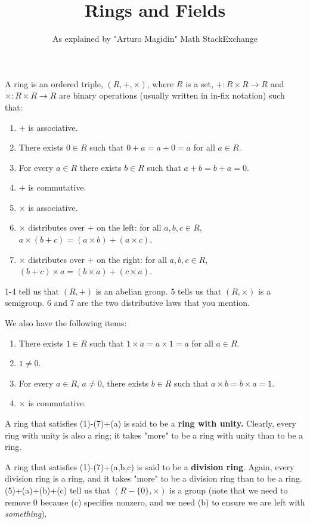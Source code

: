 \documentclass[12pt]{article}
\begin{document}
\title{Rings and Fields}
\author{As explained by "Arturo Magidin" Math StackExchange\cite{mathse}}
\maketitle

A ring is an ordered triple, $(R,+,\times)$, where $R$ is a set, $+\colon R\times R\to R$ and $\times\colon R\times R\to R$ are binary operations (usually written in in-fix notation) such that:

\begin{enumerate}
 \item $+$ is associative.
 \item There exists $0\in R$ such that $0+a=a+0=a$ for all $a\in R$.
 \item For every $a\in R$ there exists $b\in R$ such that $a+b=b+a=0$.
 \item $+$ is commutative.
 \item $\times$ is associative.
 \item $\times$ distributes over $+$ on the left: for all $a,b,c\in R$, $a\times(b+c) = (a\times b)+(a\times c)$.
 \item $\times$ distributes over $+$ on the right: for all $a,b,c\in R$, $(b+c)\times a = (b\times a)+(c\times a)$.
\end{enumerate}

1-4 tell us that $(R,+)$ is an abelian group. 5 tells us that $(R,\times)$ is a semigroup. 6 and 7 are the two distributive laws that you mention.

We also have the following items:

\begin{enumerate}[label=(\alph*)]
 \item There exists $1\in R$ such that $1\times a = a\times 1 = a$ for all $a\in R$.
 \item $1\neq 0$.
 \item For every $a\in R$, $a\neq 0$, there exists $b\in R$ such that $a\times b = b\times a = 1$.
 \item $\times$ is commutative.
\end{enumerate}

A ring that satisfies (1)-(7)+(a) is said to be a \textbf{ring with unity.} Clearly, every ring with unity is also a ring; it takes "more" to be a ring with unity than to be a ring.

A ring that satisfies (1)-(7)+(a,b,c) is said to be a \textbf{division ring}. Again,
every division ring is a ring, and it takes "more" to be a division ring than
to be a ring. (5)+(a)+(b)+(c) tell us that $(R-\{0\},\times)$ is a group (note
that we need to remove $0$ because (c) specifies nonzero, and we need (b) to
ensure we are left with \emph{something}).
\end{document}
